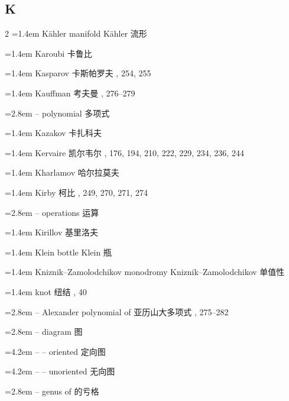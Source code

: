 \subsection*{K}
\small
\begin{multicols}{2}
\noindent\hangindent=1.4em K\"ahler manifold \quad K\"ahler 流形 \par
\noindent\hangindent=1.4em Karoubi \quad 卡鲁比 \par
\noindent\hangindent=1.4em Kasparov \quad 卡斯帕罗夫 , 254, 255\par
\noindent\hangindent=1.4em Kauffman \quad 考夫曼 , 276--279\par
\noindent\hangindent=2.8em -- polynomial \quad 多项式 \par
\noindent\hangindent=1.4em Kazakov \quad 卡扎科夫 \par
\noindent\hangindent=1.4em Kervaire \quad 凯尔韦尔 , 176, 194, 210, 222, 229, 234, 236, 244\par
\noindent\hangindent=1.4em Kharlamov \quad 哈尔拉莫夫 \par
\noindent\hangindent=1.4em Kirby \quad 柯比 , 249, 270, 271, 274\par
\noindent\hangindent=2.8em -- operations \quad 运算 \par
\noindent\hangindent=1.4em Kirillov \quad 基里洛夫 \par
\noindent\hangindent=1.4em Klein bottle \quad Klein 瓶 \par
\noindent\hangindent=1.4em Kniznik--Zamolodchikov monodromy \quad Kniznik--Zamolodchikov 单值性 \par
\noindent\hangindent=1.4em knot \quad 纽结 , 40\par
\noindent\hangindent=2.8em -- Alexander polynomial of \quad 亚历山大多项式 , 275--282\par
\noindent\hangindent=2.8em -- diagram \quad 图 \par
\noindent\hangindent=4.2em -- -- oriented \quad 定向图 \par
\noindent\hangindent=4.2em -- -- unoriented \quad 无向图 \par
\noindent\hangindent=2.8em -- genus of \quad 的亏格 \par

\end{multicols}
